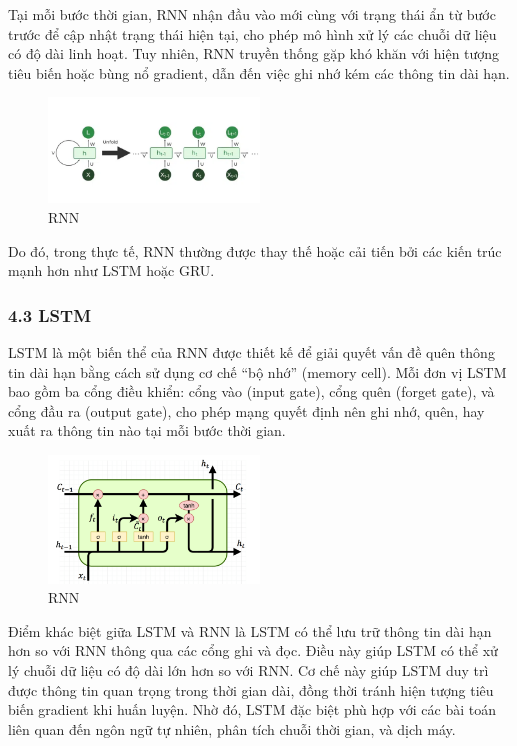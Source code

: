 \documentclass[../main.tex]{subfiles}
\begin{document}
Tại mỗi bước thời gian, RNN nhận đầu vào mới cùng với trạng thái ẩn từ bước trước để cập nhật trạng thái hiện tại, cho phép mô hình xử lý các chuỗi dữ liệu có độ dài linh hoạt. Tuy nhiên, RNN truyền thống gặp khó khăn với hiện tượng tiêu biến hoặc bùng nổ gradient, dẫn đến việc ghi nhớ kém các thông tin dài hạn.

\begin{figure}[H]
    \centering
    \includegraphics[width=0.5\textwidth]{Image/RNN.png}
    \caption{RNN}
    \label{fig:RNN}
\end{figure}

Do đó, trong thực tế, RNN thường được thay thế hoặc cải tiến bởi các kiến trúc mạnh hơn như LSTM hoặc GRU.

\subsubsection*{4.3 LSTM}

LSTM là một biến thể của RNN được thiết kế để giải quyết vấn đề quên thông tin dài hạn bằng cách sử dụng cơ chế “bộ nhớ” (memory cell). Mỗi đơn vị LSTM bao gồm ba cổng điều khiển: cổng vào (input gate), cổng quên (forget gate), và cổng đầu ra (output gate), cho phép mạng quyết định nên ghi nhớ, quên, hay xuất ra thông tin nào tại mỗi bước thời gian.

\begin{figure}[H]
    \centering
    \includegraphics[width=0.5\textwidth]{Image/lstm.png}
    \caption{RNN}
    \label{fig:RNN}
\end{figure}

Điểm khác biệt giữa LSTM và RNN là LSTM có thể lưu trữ thông tin dài hạn hơn so với RNN thông qua các cổng ghi và đọc. Điều này giúp LSTM có thể xử lý chuỗi dữ liệu có độ dài lớn hơn so với RNN. Cơ chế này giúp LSTM duy trì được thông tin quan trọng trong thời gian dài, đồng thời tránh hiện tượng tiêu biến gradient khi huấn luyện. Nhờ đó, LSTM đặc biệt phù hợp với các bài toán liên quan đến ngôn ngữ tự nhiên, phân tích chuỗi thời gian, và dịch máy.
\end{document}
